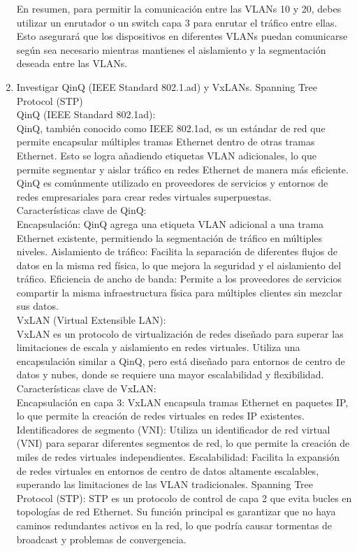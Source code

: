 \documentclass[a4paper]{article}
\begin{document}
\begin{enumerate}
En resumen, para permitir la comunicación entre las VLANs 10 y 20, debes utilizar un enrutador o un switch capa 3 para enrutar el tráfico entre ellas. Esto asegurará que los dispositivos en diferentes VLANs puedan comunicarse según sea necesario mientras mantienes el aislamiento y la segmentación deseada entre las VLANs.
\item  Investigar QinQ (IEEE Standard 802.1.ad) y VxLANs.
	Spanning Tree Protocol (STP)
\\
QinQ (IEEE Standard 802.1ad):
\\
QinQ, también conocido como IEEE 802.1ad, es un estándar de red que permite encapsular múltiples tramas Ethernet dentro de otras tramas Ethernet. Esto se logra añadiendo etiquetas VLAN adicionales, lo que permite segmentar y aislar tráfico en redes Ethernet de manera más eficiente. QinQ es comúnmente utilizado en proveedores de servicios y entornos de redes empresariales para crear redes virtuales superpuestas.
\\
Características clave de QinQ:
\\
Encapsulación: QinQ agrega una etiqueta VLAN adicional a una trama Ethernet existente, permitiendo la segmentación de tráfico en múltiples niveles.
Aislamiento de tráfico: Facilita la separación de diferentes flujos de datos en la misma red física, lo que mejora la seguridad y el aislamiento del tráfico.
Eficiencia de ancho de banda: Permite a los proveedores de servicios compartir la misma infraestructura física para múltiples clientes sin mezclar sus datos.
\\
VxLAN (Virtual Extensible LAN):
\\
VxLAN es un protocolo de virtualización de redes diseñado para superar las limitaciones de escala y aislamiento en redes virtuales. Utiliza una encapsulación similar a QinQ, pero está diseñado para entornos de centro de datos y nubes, donde se requiere una mayor escalabilidad y flexibilidad.
\\
Características clave de VxLAN:
\\
Encapsulación en capa 3: VxLAN encapsula tramas Ethernet en paquetes IP, lo que permite la creación de redes virtuales en redes IP existentes.
Identificadores de segmento (VNI): Utiliza un identificador de red virtual (VNI) para separar diferentes segmentos de red, lo que permite la creación de miles de redes virtuales independientes.
Escalabilidad: Facilita la expansión de redes virtuales en entornos de centro de datos altamente escalables, superando las limitaciones de las VLAN tradicionales.
Spanning Tree Protocol (STP):
STP es un protocolo de control de capa 2 que evita bucles en topologías de red Ethernet. Su función principal es garantizar que no haya caminos redundantes activos en la red, lo que podría causar tormentas de broadcast y problemas de convergencia.


\end{enumerate}
\end{document}
